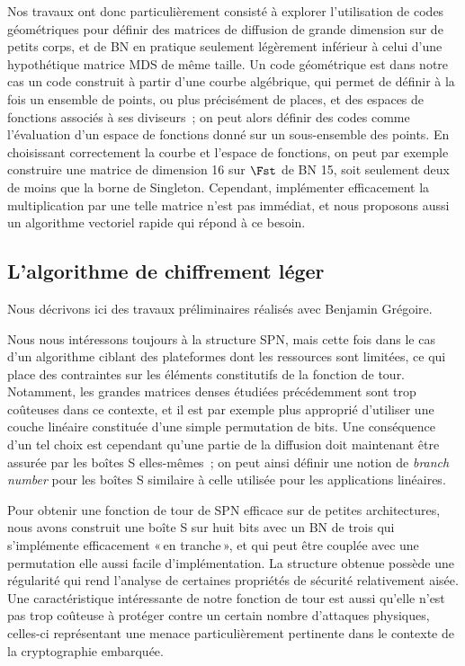 Nos travaux ont donc particulièrement consisté à explorer l'utilisation de codes géométriques pour définir des matrices de diffusion
de grande dimension sur de petits corps, et de BN en pratique seulement légèrement inférieur à celui d'une hypothétique matrice MDS de même taille.
Un code géométrique est dans notre cas un code construit à partir d'une courbe algébrique, qui permet de définir à la fois un ensemble
de points, ou plus précisément de places, et des espaces de fonctions associés à ses diviseurs~; on peut alors définir des codes
comme l'évaluation d'un espace de fonctions donné sur un sous-ensemble des points.
En choisissant correctement la courbe et l'espace de fonctions, on peut par exemple construire une matrice de dimension 16 sur
$\Fst$ de BN 15, soit seulement deux de moins que la borne de Singleton. Cependant, implémenter efficacement la multiplication par une telle
matrice n'est pas immédiat, et nous proposons aussi un algorithme vectoriel rapide qui répond à ce besoin.

\subsection{L'algorithme de chiffrement léger \fly \cite{fly}}

Nous décrivons ici des travaux préliminaires réalisés avec Benjamin Grégoire.

\medskip

Nous nous intéressons toujours à la structure SPN, mais cette fois dans le cas d'un algorithme ciblant des plateformes dont les ressources
sont limitées, ce qui place des contraintes sur les éléments constitutifs de la fonction de tour. Notamment, les grandes matrices
denses étudiées précédemment sont trop coûteuses dans ce contexte, et il est par exemple plus approprié d'utiliser une couche linéaire
constituée d'une simple permutation de bits. Une conséquence d'un tel choix est cependant qu'une partie de la diffusion doit maintenant
être assurée par les boîtes S elles-mêmes~; on peut ainsi définir une notion de \emph{branch number} pour les boîtes S similaire à celle utilisée pour
les applications linéaires.

Pour obtenir une fonction de tour de SPN efficace sur de petites architectures, nous avons construit une boîte S sur huit bits avec
un BN de trois qui s'implémente efficacement «\,en tranche\,», et qui peut être couplée avec une permutation elle aussi facile
d'implémentation. La structure obtenue possède une régularité qui rend l'analyse de certaines propriétés de sécurité
relativement aisée. Une caractéristique intéressante de notre fonction de tour est aussi qu'elle n'est pas trop coûteuse à protéger
contre un certain nombre d'attaques physiques, celles-ci représentant une menace particulièrement pertinente dans le contexte
de la cryptographie embarquée.

